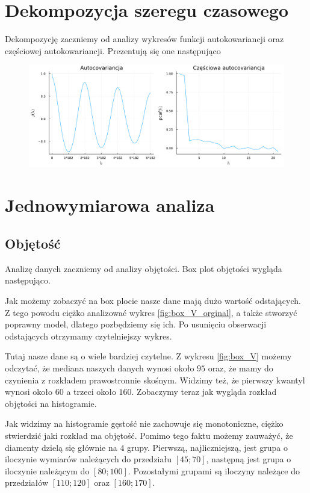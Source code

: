 \documentclass[12pt]{article}
\theoremstyle{exer}
\begin{document}
	
	\section{Dekompozycja szeregu czasowego}
	Dekompozycję zaczniemy od analizy wykresów funkcji autokowariancji oraz częściowej autokowariancji. Prezentują się one następująco
	\begin{figure}[H]
		\includegraphics[width=\columnwidth]{Budnik/img/auto_dry.png}
	\end{figure}
	
	\section{Jednowymiarowa analiza}
	\subsection{Objętość}
	Analizę danych zaczniemy od analizy objętości. Box plot objętości wygląda następująco.

	Jak możemy zobaczyć na box plocie nasze dane mają dużo wartość odstających. Z tego powodu ciężko analizować wykres \ref{fig:box_V_orginal}, a także stworzyć poprawny model, dlatego pozbędziemy się ich. Po usunięciu obserwacji odstających otrzymamy czytelniejszy wykres.

	Tutaj nasze dane są o wiele bardziej czytelne. Z wykresu \ref{fig:box_V} możemy odczytać, że mediana naszych danych wynosi około $95$ oraz, że mamy do czynienia z rozkładem prawostronnie skośnym. Widzimy też, że pierwszy kwantyl wynosi około $60$ a trzeci około $160$.
	Zobaczymy teraz jak wygląda rozkład objętości na histogramie.

	Jak widzimy na histogramie gęstość nie zachowuje się monotoniczne, ciężko stwierdzić jaki rozkład ma objętość. Pomimo tego faktu możemy zauważyć, że diamenty dzielą się głównie na $4$ grupy. Pierwszą, najliczniejszą, jest grupa o iloczynie wymiarów należących do przedziału $[45;70] $, następną jest grupa o iloczynie należącym do $[80;100]$. Pozostałymi grupami są iloczyny należące do przedziałów $[110;120]$ oraz $[160;170]$.
	
\end{document}
